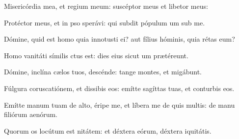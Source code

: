 \item {}

\item Misericórdia mea, et regium meum:\psstar{} suscéptor meus et libetor meus:

\item Protéctor meus, et in pso sperávi:\psstar{} qui subdit pópulum um sub me.

\item Dómine, quid est homo quia innotusti ei?\psstar{} aut fílius hóminis, quia rétas eum?

\item Homo vanitáti símilis ctus est:\psstar{} dies eius sicut um prætéreunt.

\item Dómine, inclína cælos tuos,  descénde:\psstar{} tange montes, et migábunt.

\item Fúlgura coruscatiónem, et dissibis eos:\psstar{} emítte sagíttas tuas, et conturbis eos.

\item Emítte manum tuam de alto,\pscross{} éripe me, et líbera me de quis multis:\psstar{} de manu filiórum aenórum.

\item Quorum os locútum est nitátem:\psstar{} et déxtera eórum, déxtera iquitátis.
